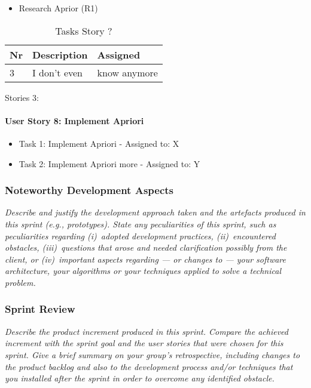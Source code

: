 \begin{itemize}	
	\item Research Aprior (R1) 
\end{itemize}

\begin{table}[h]
  \caption{Tasks Story ?}
  \label{Story ? Tasks}
  \centering
  \begin{tabular}{p{1cm}|p{5cm}|p{3cm}|}
  	Nr & Description & Assigned \\ 
  	\hline
  	3 & I don't even & know anymore \\ 
  	\hline
  \end{tabular}
\end{table}

Stories 3:

\paragraph*{User Story 8: Implement Apriori}

\begin{itemize}
	\item Task 1: Implement Apriori  - Assigned to: X
	\item Task 2: Implement Apriori more - Assigned to: Y
\end{itemize}

\subsubsection*{Noteworthy Development Aspects}
\emph{Describe and justify the development approach taken and the artefacts produced in this sprint (e.g., prototypes).  State any peculiarities of this sprint, such as peculiarities  regarding (i)~adopted development practices, (ii)~encountered obstacles, (iii)~questions that arose and needed clarification possibly from the client, or (iv)~important aspects regarding --- or changes to --- your software architecture, your algorithms or your techniques applied to solve a technical problem.}

\subsubsection*{Sprint Review}
\emph{Describe the product increment produced in this sprint. Compare the achieved increment with the sprint goal and the user stories that were chosen for this sprint. Give a brief summary on your group's retrospective, including changes to the product backlog and also to the development process and/or techniques that you installed after the sprint in order to overcome any identified obstacle.}

